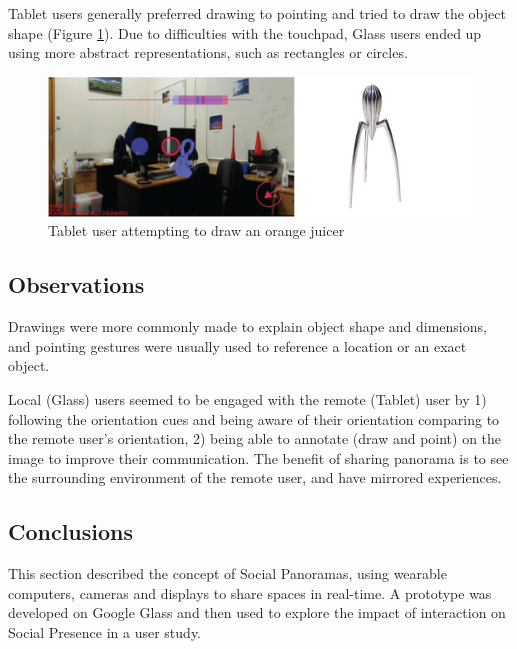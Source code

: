 Tablet users generally preferred drawing to pointing and tried to draw the object shape (Figure \ref{fig:ismar14:tablet-drawing}). Due to difficulties with the touchpad, Glass users ended up using more abstract representations, such as rectangles or circles.

\begin{figure}
    \centering
    \includegraphics[width=\linewidth]{images/63-pano-ismar14/tablet-drawing}
    \caption{Tablet user attempting to draw an orange juicer}
    \label{fig:ismar14:tablet-drawing}
\end{figure}

\subsection{Observations}

Drawings were more commonly made to explain object shape and dimensions, and pointing gestures were usually used to reference a location or an exact object. 

Local (Glass) users seemed to be engaged with the remote (Tablet) user by 1) following the orientation cues and being aware of their orientation comparing to the remote user's orientation, 2) being able to annotate (draw and point) on the image to improve their communication. The benefit of sharing panorama is to see the surrounding environment of the remote user, and have mirrored experiences.

\subsection{Conclusions}

This section described the concept of Social Panoramas, using wearable computers, cameras and displays to share spaces in real-time. A prototype was developed on Google Glass and then used to explore the impact of interaction on Social Presence in a user study. 

